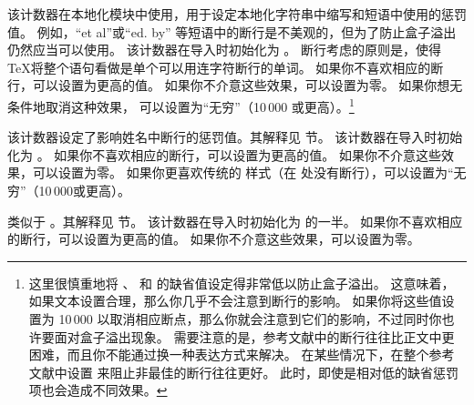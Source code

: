 \begin{ltxsyntax}
该计数器在本地化模块中使用，用于设定本地化字符串中缩写和短语中使用的惩罚值。
例如，“et al”或“ed. by” 等短语中的断行是不美观的，但为了防止盒子溢出仍然应当可以使用。
该计数器在导入时初始化为 。
断行考虑的原则是，使得 \TeX 将整个语句看做是单个可以用连字符断行的单词。
如果你不喜欢相应的断行，可以设置为更高的值。
如果你不介意这些效果，可以设置为零。
如果你想无条件地取消这种效果，
可以设置为“无穷”（10\,000 或更高）。\footnote{%
这里很慎重地将 、 和  的缺省值设定得非常低以防止盒子溢出。
这意味着，如果文本设置合理，那么你几乎不会注意到断行的影响。
如果你将这些值设置为 10\,000 以取消相应断点，那么你就会注意到它们的影响，不过同时你也许要面对盒子溢出现象。
需要注意的是，参考文献中的断行往往比正文中更困难，而且你不能通过换一种表达方式来解决。
在某些情况下，在整个参考文献中设置  来阻止非最佳的断行往往更好。
此时，即使是相对低的缺省惩罚项也会造成不同效果。}



该计数器设定了影响姓名中断行的惩罚值。其解释见  节。
该计数器在导入时初始化为 。
如果你不喜欢相应的断行，可以设置为更高的值。
如果你不介意这些效果，可以设置为零。
如果你更喜欢传统的 \BibTeX 样式（在  处没有断行），可以设置为“无穷”（10\,000或更高）。



类似于 。其解释见  节。
该计数器在导入时初始化为  的一半。
如果你不喜欢相应的断行，可以设置为更高的值。
如果你不介意这些效果，可以设置为零。



\end{ltxsyntax}
